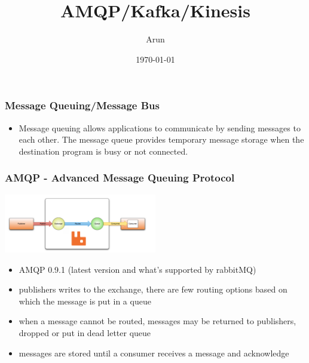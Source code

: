 \documentclass[12pt]{beamer}
\title{AMQP/Kafka/Kinesis}
\author{Arun}
\date{\today}
\begin{document}
        \begin{frame}
            \begin{center}
                \frametitle{Message Queuing/Message Bus}
                \begin{itemize}
                    \item Message queuing allows applications to communicate by sending messages to each other. The message queue provides temporary message storage when the destination program is busy or not connected.
                \end{itemize}
            \end{center}
        \end{frame}
        
        \begin{frame}
            \begin{center}
                \frametitle{AMQP - Advanced Message Queuing Protocol}
                \includegraphics[width=0.5\textwidth]{images/simple-amqp}
                \begin{itemize}
                    \item AMQP 0.9.1 (latest version and what's supported by rabbitMQ)
                    \item publishers writes to the exchange, there are few routing options based on which the message is put in a queue
                    \item when a message cannot be routed, messages may be returned to publishers, dropped or put in dead letter queue
                    \item messages are stored until a consumer receives a message and acknowledge
                \end{itemize}
            \end{center}
        \end{frame}
\end{document}
